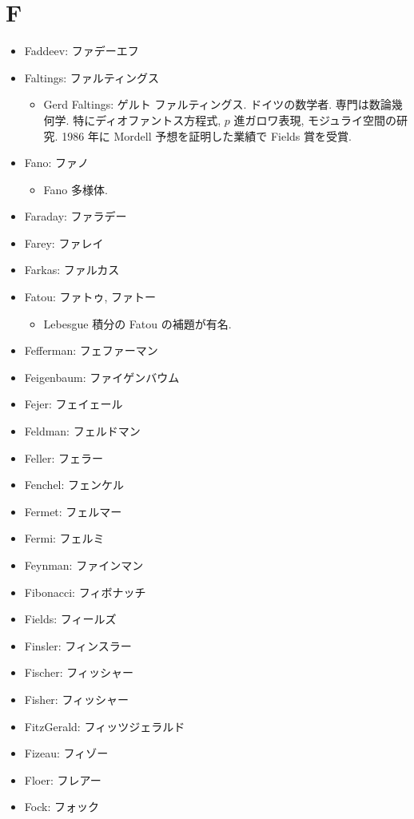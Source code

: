 \documentclass[openany, a4paper, oneside]{jsbook}
\begin{document}
\section{F}

\begin{itemize}
\item Faddeev: ファデーエフ
\item Faltings: ファルティングス
\begin{itemize}
\item Gerd Faltings: ゲルト ファルティングス. ドイツの数学者. 専門は数論幾何学. 特にディオファントス方程式, $p$ 進ガロワ表現, モジュライ空間の研究. 1986 年に Mordell 予想を証明した業績で Fields 賞を受賞.
\end{itemize}
\item Fano: ファノ
\begin{itemize}
\item Fano 多様体.
\end{itemize}
\item Faraday: ファラデー
\item Farey: ファレイ
\item Farkas: ファルカス
\item Fatou: ファトゥ, ファトー
\begin{itemize}
\item Lebesgue 積分の Fatou の補題が有名.
\end{itemize}
\item Fefferman: フェファーマン
\item Feigenbaum: ファイゲンバウム
\item Fejer: フェイェール
\item Feldman: フェルドマン
\item Feller: フェラー
\item Fenchel: フェンケル
\item Fermet: フェルマー
\item Fermi: フェルミ
\item Feynman: ファインマン
\item Fibonacci: フィボナッチ
\item Fields: フィールズ
\item Finsler: フィンスラー
\item Fischer: フィッシャー
\item Fisher: フィッシャー
\item FitzGerald: フィッツジェラルド
\item Fizeau: フィゾー
\item Floer: フレアー
\item Fock: フォック

\end{itemize}
\end{document}
